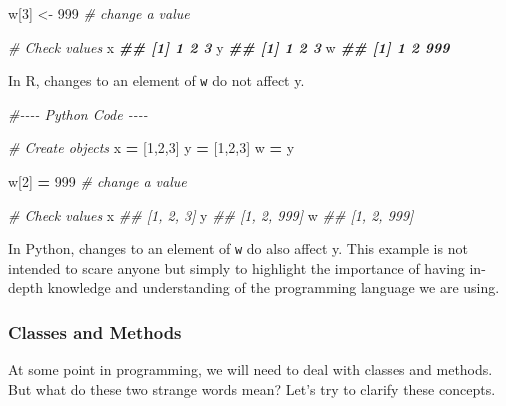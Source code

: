 \documentclass[
  11pt,
]{book}
\newenvironment{Shaded}{\begin{snugshade}}{\end{snugshade}}
\newcommand{\CommentTok}[1]{\textcolor[rgb]{0.56,0.35,0.01}{\textit{#1}}}
\newcommand{\DecValTok}[1]{\textcolor[rgb]{0.00,0.00,0.81}{#1}}
\newcommand{\DocumentationTok}[1]{\textcolor[rgb]{0.56,0.35,0.01}{\textbf{\textit{#1}}}}
\newcommand{\NormalTok}[1]{#1}
\newcommand{\OperatorTok}[1]{\textcolor[rgb]{0.81,0.36,0.00}{\textbf{#1}}}
\newcommand{\OtherTok}[1]{\textcolor[rgb]{0.56,0.35,0.01}{#1}}
\begin{document}
\begin{itemize}
\begin{Shaded}
\begin{Highlighting}[]
\NormalTok{w[}\DecValTok{3}\NormalTok{] }\OtherTok{\textless{}{-}} \DecValTok{999} \CommentTok{\# change a value}

\CommentTok{\# Check values}
\NormalTok{x}
\DocumentationTok{\#\# [1] 1 2 3}
\NormalTok{y}
\DocumentationTok{\#\# [1] 1 2 3}
\NormalTok{w}
\DocumentationTok{\#\# [1]   1   2 999}
\end{Highlighting}
\end{Shaded}

  In R, changes to an element of \texttt{w} do not affect y.

\begin{Shaded}
\begin{Highlighting}[]
\CommentTok{\#{-}{-}{-}{-}    Python Code    {-}{-}{-}{-}}

\CommentTok{\# Create objects}
\NormalTok{x }\OperatorTok{=}\NormalTok{ [}\DecValTok{1}\NormalTok{,}\DecValTok{2}\NormalTok{,}\DecValTok{3}\NormalTok{]}
\NormalTok{y }\OperatorTok{=}\NormalTok{ [}\DecValTok{1}\NormalTok{,}\DecValTok{2}\NormalTok{,}\DecValTok{3}\NormalTok{]}
\NormalTok{w }\OperatorTok{=}\NormalTok{ y}

\NormalTok{w[}\DecValTok{2}\NormalTok{] }\OperatorTok{=} \DecValTok{999} \CommentTok{\# change a value}

\CommentTok{\# Check values}
\NormalTok{x}
\CommentTok{\#\# [1, 2, 3]}
\NormalTok{y}
\CommentTok{\#\# [1, 2, 999]}
\NormalTok{w}
\CommentTok{\#\# [1, 2, 999]}
\end{Highlighting}
\end{Shaded}

  In Python, changes to an element of \texttt{w} do also affect y. This example is not intended to scare anyone but simply to highlight the importance of having in-depth knowledge and understanding of the programming language we are using.
\end{itemize}

\hypertarget{classes-methods}{%
\subsubsection{Classes and Methods}\label{classes-methods}}

At some point in programming, we will need to deal with classes and methods. But what do these two strange words mean? Let's try to clarify these concepts.
\end{document}
